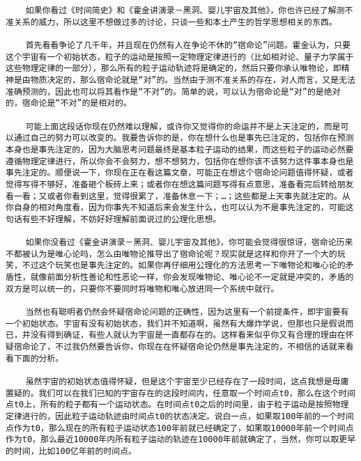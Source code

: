 \begin{verbatim}
    如果你看过《时间简史》和《霍金讲演录－黑洞、婴儿宇宙及其他》，你也许已经了解测不准关系的威力，所以这里不想做过多的讨论，只谈一些和本土产生的哲学思想相关的东西。

    首先看看争论了几千年，并且现在仍然有人在争论不休的“宿命论”问题。霍金认为，只要这个宇宙有一个初始状态，粒子的运动是按照一定物理定律进行的（比如相对论、量子力学属于这些物理定律的一部分），那么所有的粒子运动轨迹将是确定的，然后只要你承认唯物论，即精神是由物质决定的，那么宿命论就是“对”的。当然由于测不准关系的存在，对人而言，又是无法准确预测的，因此也可以将其看作是“不对”的。简单的说，可以认为宿命论是“对”的是绝对的，宿命论是“不对”的是相对的。

    可能上面这段话你现在仍然难以理解，或许你又觉得你的命运并不是上天注定的，而是可以通过自己的努力可以改变的。我要告诉你的是，你在想什么也是事先已注定的，包括你在预测本身也是事先注定的，因为大脑思考问题最终是基本粒子运动的结果，而这些粒子的运动必然要遵循物理定律进行，所以你会不会努力，想不想努力，包括你在想你该不该努力这件事本身也是事先注定的。顺便说一下，你现在正在看这篇文章，可能正在想这个宿命论问题值得怀疑，或者觉得写得不够好，准备砸个板砖上来；或者你在想这篇问题写得有点意思，准备看完后转给朋友看一看；又或者你看到这里，觉得很累了，准备休息一下；…；这些都是上天事先就注定的。从你自身的相对角度看，因为你事先不知道后来会发生什么，也可以认为不是事先注定的，可能这句话有些不好理解，不妨好好理解前面说过的公理化思想。

    如果你没看过《霍金讲演录－黑洞、婴儿宇宙及其他》，你可能会觉得很惊讶，宿命论历来不都被认为是唯心论吗，怎么由唯物论推导出了宿命论呢？现实就是这样和你开了一个大的玩笑，不过这个玩笑也是事先注定的。如果你再仔细用公理化的方法思考一下唯物论和唯心论的矛盾性，就像前面分析性善论和性恶论一样，你会发现唯物论、唯心论不一定就是冲突的，矛盾的双方是可以统一的，只要你不要同时将唯物和唯心放进同一个系统中就行。

    当然也有聪明者仍然会怀疑宿命论问题的正确性，因为这里有一个前提条件，即宇宙要有一个初始状态。宇宙有没有初始状态，我们并不知道啊，虽然有大爆炸学说，但那也只是假说而已，并没有得到确证，有些人就认为宇宙是一直都存在的。这样看来似乎你又有合理的理由在怀疑宿命论了，不过我仍然要告诉你，你现在在怀疑宿命论仍然是事先注定的，不相信的话就来看看下面的分析。

    虽然宇宙的初始状态值得怀疑，但是这个宇宙至少已经存在了一段时间，这点我想是毋庸置疑的。我们可以在我们已知的宇宙存在的这段时间内，任意取一个时间点t0，那么在这个时间点t0上，所有的粒子都有一个运动状态。在时间点t0之后的时间里，由于粒子运动是按照物理定律进行的，因此粒子运动轨迹由时间点t0的状态决定。说白一点，如果取100年前的一个时间点作为t0，那么现在的所有粒子运动状态100年前就已经确定了，如果取10000年前一个时间点作为t0，那么最近10000年内所有粒子运动的轨迹在10000年前就确定了，当然，你可以取更早的时间，比如100亿年前的时间点。


\end{verbatim}
